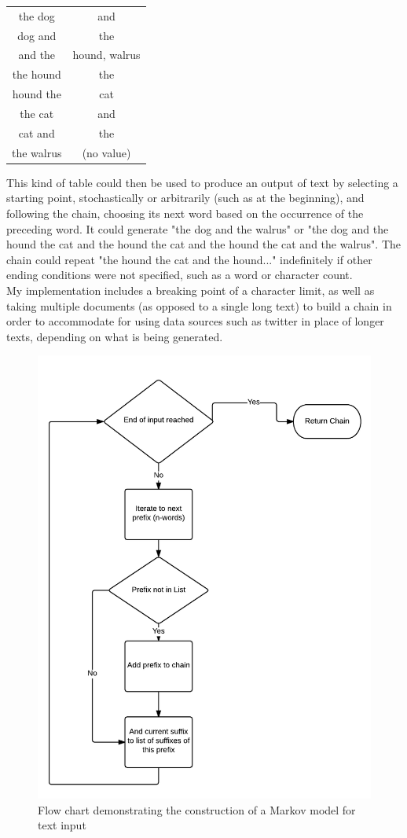 \begin{center}
	\begin{tabular}{ |c|c| } 
		\hline
		the dog & and \\ 
		dog and & the\\ 
		and the & hound, walrus\\ 
		the hound & the\\
		hound the & cat\\
		the cat & and\\
		cat and & the \\
		the walrus & (no value)\\
		\hline
	\end{tabular}
\end{center}

This kind of table could then be used to produce an output of text by selecting a starting point, stochastically or arbitrarily (such as at the beginning), and following the chain, choosing its next word based on the occurrence of the preceding word.
It could generate "the dog and the walrus" or "the dog and the hound the cat and the hound the cat and the hound the cat and the walrus". The chain could repeat "the hound the cat and the hound..." indefinitely if other ending conditions were not specified, such as a word or character count.\\

My implementation includes a breaking point of a character limit, as well as taking multiple documents (as opposed to a single long text) to build a chain in order to accommodate for using data sources such as twitter in place of longer texts, depending on what is being generated.\\

\begin{figure}
\centering
\includegraphics[width=0.7\linewidth]{"figures/diagrams_etc/MarkovChain-GenerateTable - Page 1"}
\caption{Flow chart demonstrating the construction of a Markov model for text input}
\label{fig:markovchain-generatetable---page-1}
\end{figure}



